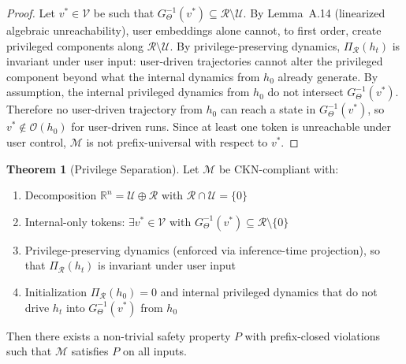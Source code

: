 \documentclass[11pt]{article}
\theoremstyle{definition}
\newtheorem{theorem}{Theorem}[section]
\theoremstyle{remark}
\begin{document}
\begin{proof}
Let $v^* \in \mathcal{V}$ be such that $G_\Theta^{-1}(v^*) \subseteq \mathcal{R} \setminus \mathcal{U}$. By Lemma~A.14 (linearized algebraic unreachability), user embeddings alone cannot, to first order, create privileged components along $\mathcal{R} \setminus \mathcal{U}$. By privilege-preserving dynamics, $\Pi_\mathcal{R}(h_t)$ is invariant under user input: user-driven trajectories cannot alter the privileged component beyond what the internal dynamics from $h_0$ already generate. By assumption, the internal privileged dynamics from $h_0$ do not intersect $G_\Theta^{-1}(v^*)$. Therefore no user-driven trajectory from $h_0$ can reach a state in $G_\Theta^{-1}(v^*)$, so $v^* \notin \mathcal{O}(h_0)$ for user-driven runs. Since at least one token is unreachable under user control, $\mathcal{M}$ is not prefix-universal with respect to $v^*$.
\end{proof}

\begin{theorem}[Privilege Separation]
Let $\mathcal{M}$ be CKN-compliant with:
\begin{enumerate}[nosep,label=(\arabic*), topsep=0.3em]
    \item Decomposition $\mathbb{R}^n = \mathcal{U} \oplus \mathcal{R}$ with $\mathcal{R} \cap \mathcal{U} = \{0\}$
    \item Internal-only tokens: $\exists v^* \in \mathcal{V}$ with $G_\Theta^{-1}(v^*) \subseteq \mathcal{R} \setminus \{0\}$
    \item Privilege-preserving dynamics (enforced via inference-time projection), so that $\Pi_\mathcal{R}(h_t)$ is invariant under user input
    \item Initialization $\Pi_\mathcal{R}(h_0) = 0$ and internal privileged dynamics that do not drive $h_t$ into $G_\Theta^{-1}(v^*)$ from $h_0$
\end{enumerate}
Then there exists a non-trivial safety property $P$ with prefix-closed violations such that $\mathcal{M}$ satisfies $P$ on all inputs.
\end{theorem}
\end{document}
